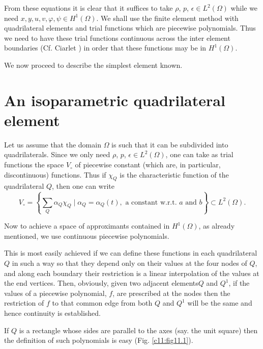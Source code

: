 From these equations it is clear that it suffices to take $\rho$, $p$, $\epsilon \in L^2 (\Omega)$ while we need $x,y,u, v,\varphi, \psi \in H^1 (\Omega)$. We shall use the finite element method with quadrilateral elements and trial functions which are piecewise polynomials. Thus we need to have these trial functions continuous across the inter element boundaries (Cf. Ciarlet \cite{key6}) in order that these functions may be in $H^1(\Omega)$.

We now proceed to describe the simplest element known.

\section{An isoparametric quadrilateral element}\label{chap11:sec11.3}
Let us assume that the domain $\Omega$ is such that it can be subdivided into quadrilaterals. Since we only need $\rho$, $p$, $\epsilon \in L^2 (\Omega)$, one can take as trial functions the space $V_\circ$ of piecewise constant (which are, in particular, discontinuous) functions. Thus if $\chi_Q$ is the characteristic function of the quadrilateral $Q$, then one can write
$$
V_\circ = \left\{ \sum\limits_Q \alpha_Q \chi_Q \mid \alpha_Q = \alpha_Q (t), \text{ a constant w.r.t. $a$ and $b$}\right\} \subset L^2 (\Omega).
$$

Now to achieve a space of approximants contained in $H^1 (\Omega)$, as already mentioned, we use continuous piecewise polynomials.

This is most easily achieved if we can define these functions in each quadrilateral $Q$ in such a way so that they depend only on their values at the four nodes of $Q$, and along each boundary their restriction is a linear interpolation of the values at the end vertices. Then, obviously, given two adjacent elements\pageoriginale $Q$ and $Q^1$, if the values of a piecewise polynomial, $f$, are prescribed at the nodes then the restriction of $f$ to that common edge from both $Q$ and $Q^1$ will be the same and hence continuity is established.

If $Q$ is a rectangle whose sides are parallel to the axes (say. the
unit square) then the definition of such polynomials is easy
(Fig. \ref{c11:fig11.1}). 

